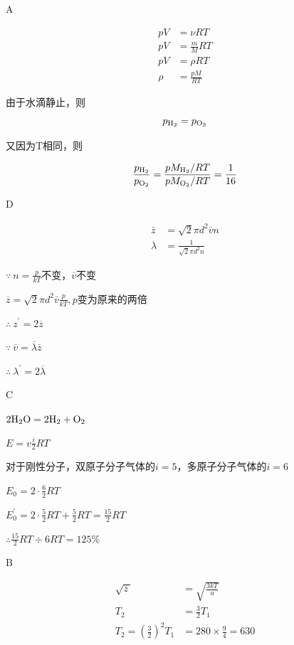 \exercise A

\solve

$$
\begin{aligned} 
p V & = \nu R T \\ p V & = \frac { m } { M } R T \\
p V & = \rho R T \\
\rho & = \frac { p M } { R T }
\end{aligned}
$$

由于水滴静止，则
$$
p_{\ce{H2}} =p_{\ce{O2}}
$$

又因为T相同，则

$$
\frac { p_{\ce{H2}} } { p _{\ce{O2}} } = \frac{pM_{\ce{H2}}/RT} {pM_{\ce{O2}}/RT}=\frac{1}{16}
$$

\exercise D

\solve

$$
\begin{aligned}
 \bar { z } & = \sqrt { 2 } \pi d ^ { 2 } \bar { v } n \\ \lambda & = \frac { 1 } { \sqrt { 2 } \pi d ^ { 2 } n } 
\end{aligned}
$$

$\because\ n = \frac { p } { k T }$不变，$\overline{v}$不变

$
\overline{ z } = \sqrt { 2 } \pi d ^ { 2 } \bar { v } \frac { p } { k T },p$变为原来的两倍

$\therefore\ z^{\prime} = 2\overline{z}$

$\because\ \overline{v}=\overline{\lambda}\overline{z}$

$\therefore\ \lambda ^ { \prime } = 2 \overline{ \lambda }$

\exercise C

\solve

$2\ce{H2O} = 2\ce{H2}+\ce{O2}$

$E=v\frac{i}{2}RT$

对于刚性分子，双原子分子气体的$i=5$，多原子分子气体的$i=6$

$E _ { 0 } = 2 \cdot \frac { 6 } { 2 } R T$

$E_0^ { \prime }=2\cdot\frac{5}{2}R T + \frac { 5 } { 2 } R T = \frac { 15 } { 2 } R T$

$\therefore \frac { 15 } { 2 } R T \div 6 R T = 125 \%$

\exercise B

\solve

$$
\begin{aligned} 
\sqrt{\overline{z}\ } & = \sqrt { \frac { 3 k T } { u } } \\
T _ { 2 } & = \frac { 3 } { 2 } T _ { 1 } \\
T _ { 2 } = \left( \frac { 3 } { 2 } \right) ^ { 2 } T _ { 1 } & = 280 \times \frac { 9 } { 4 } = 630 
\end{aligned}
$$
